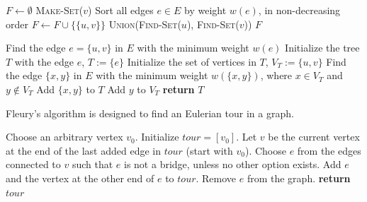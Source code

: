 \documentclass[12pt]{article}
\theoremstyle{remarkstyle}
\begin{document}
	\begin{algorithm}[htb]
		\caption{Kruskal's Algorithm}
		\begin{algorithmic}[1]
			\State \( F \gets \emptyset \)
			\State \textsc{Make-Set}(\( v \))
			\EndFor
			\State Sort all edges \( e \in E \) by weight \( w(e) \), in non-decreasing order
			\State \( F \gets F \cup \{ \{u, v\} \} \)
			\State \textsc{Union}(\textsc{Find-Set}(\( u \)), \textsc{Find-Set}(\( v \)))
			\EndIf
			\EndFor
			\State \Return \( F \)
		\end{algorithmic}
	\end{algorithm}
	
	\begin{algorithm}[H]
		\caption{Prim's Algorithm}
		\begin{algorithmic}[1]
			\State Find the edge \( e = \{u, v\} \) in \( E \) with the minimum weight \( w(e) \)
			\State Initialize the tree \( T \) with the edge \( e \), \( T := \{e\} \)
			\State Initialize the set of vertices in \( T \), \( V_T := \{u, v\} \)
			\State Find the edge \( \{x, y\} \) in \( E \) with the minimum weight \( w(\{x, y\}) \), where \( x \in V_T \) and \( y \notin V_T \)
			\State Add \( \{x, y\} \) to \( T \)
			\State Add \( y \) to \( V_T \)
			\EndWhile
			\State \textbf{return} \( T \)
		\end{algorithmic}
	\end{algorithm}
	
	Fleury's algorithm is designed to find an Eulerian tour in a graph.
	
	\begin{algorithm}
		\caption{Fleury’s Algorithm}
		\begin{algorithmic}[1]
			\State Choose an arbitrary vertex \( v_0 \).
			\State Initialize \( tour = [v_0] \).
			\State Let \( v \) be the current vertex at the end of the last added edge in \( tour \) (start with \( v_0 \)).
			\State Choose \( e \) from the edges connected to \( v \) such that $e$ is not a bridge, unless no other option exists.
			\State Add \( e \) and the vertex at the other end of \( e \) to \( tour \).
			\State Remove \( e \) from the graph.
			\EndWhile
			\State \textbf{return} \( tour \)
		\end{algorithmic}
	\end{algorithm}
\end{document}
